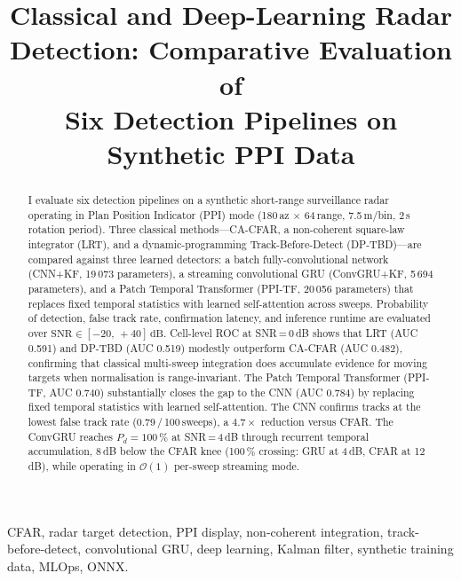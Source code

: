 \documentclass[conference]{IEEEtran}
\begin{document}
\title{Classical and Deep-Learning Radar Detection: Comparative Evaluation of\\
Six Detection Pipelines on Synthetic PPI Data}

\author{
}

\maketitle

\begin{abstract}
I evaluate six detection pipelines on a synthetic short-range
surveillance radar operating in Plan Position Indicator (PPI) mode
(180\,az $\times$ 64\,range, 7.5\,m/bin, 2\,s rotation period).
Three classical methods---CA-CFAR, a non-coherent square-law integrator
(LRT), and a dynamic-programming Track-Before-Detect (DP-TBD)---are
compared against three learned detectors: a batch fully-convolutional
network (CNN+KF, 19\,073 parameters), a streaming convolutional GRU
(ConvGRU+KF, 5\,694 parameters), and a Patch Temporal Transformer
(PPI-TF, 20\,056 parameters) that replaces fixed temporal statistics
with learned self-attention across sweeps.
Probability of detection, false track rate, confirmation latency, and
inference runtime are evaluated over
$\mathrm{SNR} \in [-20,\,+40]\,\mathrm{dB}$.
Cell-level ROC at SNR\,=\,0\,dB shows that LRT (AUC 0.591) and DP-TBD
(AUC 0.519) modestly outperform CA-CFAR (AUC 0.482), confirming that
classical multi-sweep integration does accumulate evidence for moving
targets when normalisation is range-invariant.
The Patch Temporal Transformer (PPI-TF, AUC 0.740) substantially closes
the gap to the CNN (AUC 0.784) by replacing fixed temporal statistics
with learned self-attention.
The CNN confirms tracks at the lowest false track rate (0.79\,/\,100\,sweeps),
a $4.7\times$ reduction versus CFAR.
The ConvGRU reaches $P_d = 100\,\%$ at SNR\,=\,4\,dB through recurrent
temporal accumulation, 8\,dB below the CFAR knee (100\,\% crossing: GRU at 4\,dB, CFAR at 12\,dB), while operating in
$\mathcal{O}(1)$ per-sweep streaming mode.
\end{abstract}

\begin{IEEEkeywords}
CFAR, radar target detection, PPI display, non-coherent integration,
track-before-detect, convolutional GRU, deep learning, Kalman filter,
synthetic training data, MLOps, ONNX.
\end{IEEEkeywords}
\end{document}
